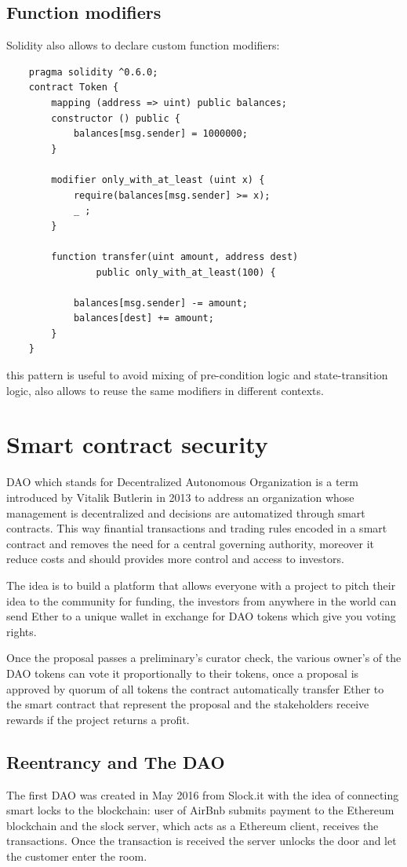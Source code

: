 \subsection{Function modifiers}
Solidity also allows to declare custom function modifiers:
\begin{verbatim}
    pragma solidity ^0.6.0;
    contract Token {
        mapping (address => uint) public balances;
        constructor () public {
            balances[msg.sender] = 1000000;
        }

        modifier only_with_at_least (uint x) {
            require(balances[msg.sender] >= x);
            _ ;
        }

        function transfer(uint amount, address dest) 
                public only_with_at_least(100) {

            balances[msg.sender] -= amount;
            balances[dest] += amount;
        }
    }
\end{verbatim}
this pattern is useful to avoid mixing of pre-condition logic and state-transition logic, also allows to reuse the same modifiers in different contexts.

\section{Smart contract security}
DAO which stands for Decentralized Autonomous Organization is a term introduced by Vitalik Butlerin in 2013 to address an organization whose management is decentralized and decisions are automatized through smart contracts.
This way finantial transactions and trading rules encoded in a smart contract and removes the need for a central governing authority, moreover it reduce costs and should provides more control and access to investors.

The idea is to build a platform that allows everyone with a project to pitch their idea to the community for funding, the investors from anywhere in the world can send Ether to a unique wallet in exchange for DAO tokens which give you voting rights.

Once the proposal passes a preliminary's curator check, the various owner's of the DAO tokens can vote it proportionally to their tokens, once a proposal is approved by quorum of all tokens the contract automatically transfer Ether to the smart contract that represent the proposal and the stakeholders receive rewards if the project returns a profit.

\subsection{Reentrancy and The DAO}
The first DAO was created in May 2016 from Slock.it with the idea of connecting smart locks to the blockchain: user of AirBnb submits payment to the Ethereum blockchain and the slock server, which acts as a Ethereum client, receives the transactions.
Once the transaction is received the server unlocks the door and let the customer enter the room.

